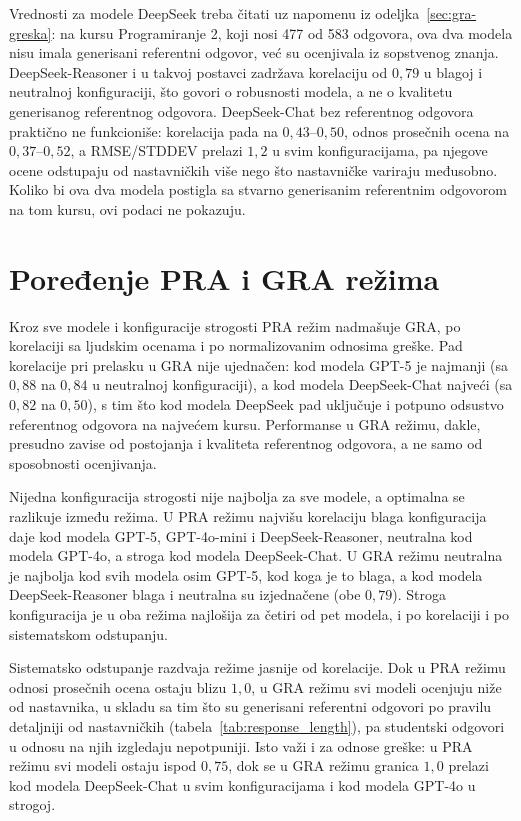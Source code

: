 Vrednosti za modele DeepSeek treba čitati uz napomenu iz odeljka~\ref{sec:gra-greska}:
na kursu Programiranje 2, koji nosi 477 od 583 odgovora, ova dva modela nisu imala generisani referentni odgovor,
već su ocenjivala iz sopstvenog znanja.
DeepSeek-Reasoner i u takvoj postavci zadržava korelaciju od $0{,}79$ u blagoj i neutralnoj konfiguraciji,
što govori o robusnosti modela, a ne o kvalitetu generisanog referentnog odgovora.
DeepSeek-Chat bez referentnog odgovora praktično ne funkcioniše: korelacija pada na $0{,}43$--$0{,}50$, odnos prosečnih ocena na $0{,}37$--$0{,}52$,
a RMSE/STDDEV prelazi $1{,}2$ u svim konfiguracijama, pa njegove ocene odstupaju od nastavničkih više nego što nastavničke variraju međusobno.
Koliko bi ova dva modela postigla sa stvarno generisanim referentnim odgovorom na tom kursu, ovi podaci ne pokazuju.

\section{Poređenje PRA i GRA režima}
\label{sec:pra-vs-gra}

Kroz sve modele i konfiguracije strogosti PRA režim nadmašuje GRA, po korelaciji sa ljudskim ocenama i po normalizovanim odnosima greške.
Pad korelacije pri prelasku u GRA nije ujednačen: kod modela GPT-5 je najmanji (sa $0{,}88$ na $0{,}84$ u neutralnoj konfiguraciji),
a kod modela DeepSeek-Chat najveći (sa $0{,}82$ na $0{,}50$),
s tim što kod modela DeepSeek pad uključuje i potpuno odsustvo referentnog odgovora na najvećem kursu.
Performanse u GRA režimu, dakle, presudno zavise od postojanja i kvaliteta referentnog odgovora, a ne samo od sposobnosti ocenjivanja.

Nijedna konfiguracija strogosti nije najbolja za sve modele, a optimalna se razlikuje između režima.
U PRA režimu najvišu korelaciju blaga konfiguracija daje kod modela GPT-5,
GPT-4o-mini i DeepSeek-Reasoner, neutralna kod modela GPT-4o, a stroga kod modela DeepSeek-Chat.
U GRA režimu neutralna je najbolja kod svih modela osim GPT-5, kod koga je to blaga,
a kod modela DeepSeek-Reasoner blaga i neutralna su izjednačene (obe $0{,}79$).
Stroga konfiguracija je u oba režima najlošija za četiri od pet modela, i po korelaciji i po sistematskom odstupanju.

Sistematsko odstupanje razdvaja režime jasnije od korelacije.
Dok u PRA režimu odnosi prosečnih ocena ostaju blizu $1{,}0$, u GRA režimu svi modeli ocenjuju niže od nastavnika,
u skladu sa tim što su generisani referentni odgovori po pravilu detaljniji od nastavničkih (tabela~\ref{tab:response_length}),
pa studentski odgovori u odnosu na njih izgledaju nepotpuniji.
Isto važi i za odnose greške: u PRA režimu svi modeli ostaju ispod $0{,}75$,
dok se u GRA režimu granica $1{,}0$ prelazi kod modela DeepSeek-Chat u svim konfiguracijama i kod modela GPT-4o u strogoj.

